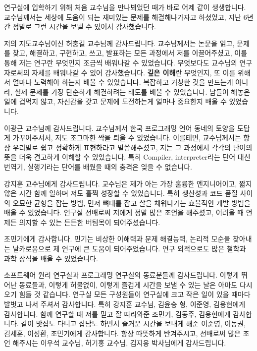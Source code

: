 \begin{acknowledgement}
  연구실에 입학하기 위해 처음 교수님을 만나뵈었던 때가 바로 어제 같이 생생합니다. 교수님께서는 세상에 도움이 되는 재미있는 문제를 해결해나가자고 하셨었고, 지난 6년간 정말로 그런 시간을 보낼 수 있어서 감사했습니다.

  저의 지도교수님이신 허충길 교수님께 감사드립니다.
  교수님께서는 논문을 읽고, 문제를 찾고, 해결하고, 구현하고, 쓰고, 발표하는 모든 과정에서 저를 이끌어주셨고, 이를 통해 저는 연구란 무엇인지 조금씩 배워나갈 수 있었습니다.
  무엇보다도 교수님의 연구자로써의 자세를 배워나갈 수 있어 감사했습니다.
  \textbf{깊은 이해}란 무엇인지, 또 이를 위해서 얼마나 노력해야 하는지 배울 수 있었습니다.
  복잡하고 거창한 것을 만드는게 아니라, 실제 문제를 가장 단순하게 해결하려는 태도를 배울 수 있었습니다.
  남들이 해놓은 일에 겁먹지 않고, 자신감을 갖고 문제에 도전하는게 얼마나 중요한지 배울 수 있었습니다.

  이광근 교수님께 감사드립니다.
  교수님께서 한국 프로그래밍 언어 동네의 토양을 도탑게 가꾸어주셔서, 저도 조그마한 싹을 틔울 수 있었습니다.
  이를테면, 교수님께서는 항상 우리말로 쉽고 정확하게 표현하라고 말씀해주셨고, 저는 그 과정에서 각각의 단어의 뜻을 더욱 견고하게 이해할 수 있었습니다.
  특히 Compiler, interpreter라는 단어 대신 번역기, 실행기라는 단어를 배웠을 때의 충격은 잊을 수 없습니다.

  강지훈 교수님에게 감사드립니다.
  교수님은 제가 아는 가장 훌륭한 엔지니어이고, 짧지 않은 시간 함께 일하며 저도 훌쩍 성장할 수 있었습니다. 
  특히 생산성과 코드 품질 사이의 오묘한 균형을 잡는 방법, 먼저 뼈대를 잡고 살을 채워나가는 효율적인 개발 방법을 배울 수 있었습니다.
  연구실 선배로써 저에게 정말 많은 조언을 해주셨고, 어려울 때 언제든 의지할 수 있는 든든한 버팀목이 되어주셨습니다.

  조민기에게 감사합니다.
  민기는 비상한 이해력과 문제 해결능력, 논리적 모순을 찾아내는 날카로움으로 제 연구에 큰 도움이 되어주었습니다.
  연구 외적으로도 많은 철학과 과학 상식을 배울 수 있었습니다.

  소프트웨어 원리 연구실과 프로그래밍 연구실의 동료분들께 감사드립니다.
  이렇게 뛰어난 동료들과, 이렇게 허물없이, 이렇게 즐겁게 시간을 보낼 수 있는 날은 아마도 다시 오기 힘들 것 같습니다.
  연구실 모든 구성원들이 연구실에 크고 작은 일이 있을 때마다 발벗고 나서 주셔서 감사합니다. 특히 강지훈 교수님, 김윤승 형, 이준영, 김용현에게 감사합니다.
  함께 연구할 때 저를 믿고 잘 따라와준 조민기, 김동주, 김용현에게 감사합니다.
  같이 맛집도 다니고 잡담도 하면서 즐거운 시간을 보내게 해준 이준영, 이동권, 김세훈, 이성환, 조민기에게 감사합니다.
  항상 따뜻하게 반겨주시고, 선배로써 많은 조언 해주시는 이우석 교수님, 허기홍 교수님, 김지응 박사님에게 감사드립니다.


\end{acknowledgement}

